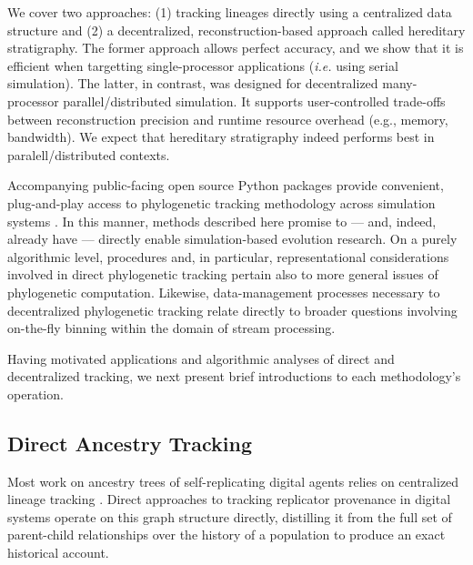 
We cover two approaches: (1) tracking lineages directly using a centralized data structure and (2) a decentralized, reconstruction-based approach called hereditary stratigraphy.
The former approach allows perfect accuracy, and we show that it is efficient when targetting single-processor applications (\textit{i.e.} using serial simulation).
The latter, in contrast, was designed for decentralized many-processor parallel/distributed simulation.
It supports user-controlled trade-offs between reconstruction precision and runtime resource overhead (e.g., memory, bandwidth).
We expect that hereditary stratigraphy indeed performs best in paralell/distributed contexts.

Accompanying public-facing open source Python packages provide convenient, plug-and-play access to phylogenetic tracking methodology across simulation systems \citep{moreno2022hstrat,dolson2023phylotrackpy}.
In this manner, methods described here promise to --- and, indeed, already have --- directly enable simulation-based evolution research.
On a purely algorithmic level, procedures and, in particular, representational considerations involved in direct phylogenetic tracking pertain also to more general issues of phylogenetic computation.
Likewise, data-management processes necessary to decentralized phylogenetic tracking relate directly to broader questions involving on-the-fly binning within the domain of stream processing. %

Having motivated applications and algorithmic analyses of direct and decentralized tracking, we next present brief introductions to each methodology's operation.

\subsection{Direct Ancestry Tracking}

Most work on ancestry trees of self-replicating digital agents relies on centralized lineage tracking \citep{friggeri2014rumor,cohen1987computer,dolson2023phylotrackpy}.
Direct approaches to tracking replicator provenance in digital systems operate on this graph structure directly, distilling it from the full set of parent-child relationships over the history of a population to produce an exact historical account.

